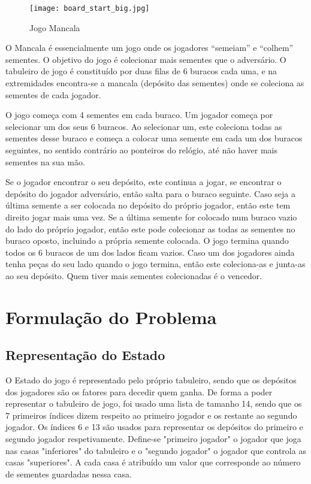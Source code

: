 \documentclass[conference]{IEEEtran}
\begin{document}
\begin{figure}[htbp]
    \centerline{\texttt{[image: board\_start\_big.jpg]}}
    \caption{Jogo Mancala}
    \label{img}
\end{figure}

O Mancala \'e essencialmente um jogo onde os jogadores “semeiam” e “colhem” sementes\cite{b1}.
O objetivo do jogo \'e colecionar mais sementes que o advers\'ario.
O tabuleiro de jogo \'e constitu\'ido por duas filas de 6 buracos cada uma, e na extremidades encontra-se  a mancala (dep\'osito das sementes) onde se coleciona as sementes de cada jogador.

O jogo come\c ca com 4 sementes em cada buraco. Um jogador come\c ca por selecionar um dos seus 6 buracos. Ao selecionar um, este coleciona todas as sementes desse buraco e come\c ca a colocar uma semente em cada um dos buracos seguintes, no sentido contr\'ario ao ponteiros do rel\'ogio, at\'e n\~ao haver mais sementes na sua m\~ao.

Se o jogador encontrar o seu dep\'osito, este continua a jogar, se encontrar o dep\'osito do jogador advers\'ario, ent\~ao salta para o buraco seguinte. Caso seja a \'ultima semente a ser colocada no dep\'osito do pr\'oprio jogador, ent\~ao este tem direito jogar mais uma vez.
Se a \'ultima semente for colocado num buraco vazio do lado do pr\'oprio jogador, ent\~ao este pode colecionar as todas as sementes no buraco oposto, incluindo a pr\'opria semente colocada.
O jogo termina quando todos os 6 buracos de um dos lados ficam vazios. Caso um dos jogadores ainda tenha pe\c cas do seu lado quando o jogo termina, ent\~ao este coleciona-as e junta-as ao seu dep\'osito. 
Quem tiver mais sementes colecionadas \'e o vencedor.


\section{Formula\c c\~ao do Problema}

\subsection{Representa\c c\~ao do Estado}
O Estado do jogo \'e representado pelo pr\'oprio tabuleiro, sendo que os dep\'ositos dos jogadores s\~ao os fatores para decedir quem ganha.
De forma a poder representar o tabuleiro de jogo, foi usado uma lista de tamanho 14, sendo que os 7 primeiros \'indices dizem respeito ao primeiro jogador e os restante ao segundo jogador.
Os \'indices 6 e 13 s\~ao usados para representar os dep\'ositos do primeiro e segundo jogador respetivamente. Define-se "primeiro jogador" o jogador que joga nas casas "inferiores" do tabuleiro e o "segundo jogador" o jogador que controla as casas "superiores".
A cada casa \'e atribu\'ido um valor que corresponde ao n\'umero de sementes guardadas nessa casa.\\
\end{document}
